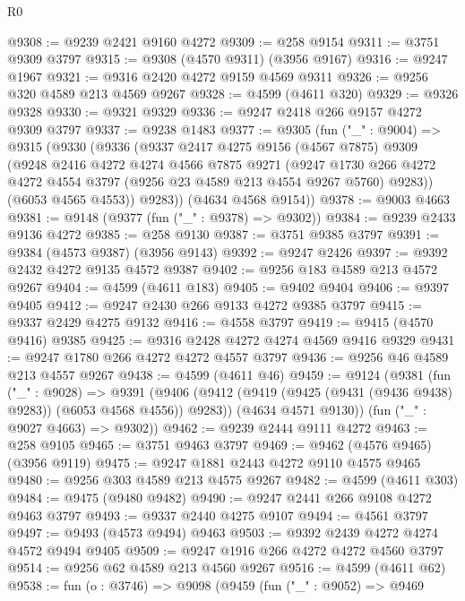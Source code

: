 \begin{lexlean}{R0}
\begin{coremodule}
@9308 := @9239 @2421 @9160 @4272
@9309 := @258 @9154
@9311 := @3751 @9309 @3797
@9315 := @9308 (@4570 @9311) (@3956 @9167)
@9316 := @9247 @1967
@9321 := @9316 @2420 @4272 @9159 @4569 @9311
@9326 := @9256 @320 @4589 @213 @4569 @9267
@9328 := @4599 (@4611 @320)
@9329 := @9326 @9328
@9330 := @9321 @9329
@9336 := @9247 @2418 @266 @9157 @4272 @9309 @3797
@9337 := @9238 @1483
@9377 := @9305
    (fun ("_" : @9004) =>
    @9315
      (@9330
        (@9336
          (@9337
            @2417
            @4275
            @9156
            (@4567 @7875)
            @9309
            (@9248
              @2416
              @4272
              @4274
              @4566
              @7875
              @9271
              (@9247
                @1730
                @266
                @4272
                @4272
                @4554
                @3797
                (@9256 @23 @4589 @213 @4554 @9267 @5760)
                @9283))
            (@6053 @4565 @4553))
          @9283))
      (@4634 @4568 @9154))
@9378 := @9003 @4663
@9381 := @9148 (@9377 (fun ("_" : @9378) => @9302))
@9384 := @9239 @2433 @9136 @4272
@9385 := @258 @9130
@9387 := @3751 @9385 @3797
@9391 := @9384 (@4573 @9387) (@3956 @9143)
@9392 := @9247 @2426
@9397 := @9392 @2432 @4272 @9135 @4572 @9387
@9402 := @9256 @183 @4589 @213 @4572 @9267
@9404 := @4599 (@4611 @183)
@9405 := @9402 @9404
@9406 := @9397 @9405
@9412 := @9247 @2430 @266 @9133 @4272 @9385 @3797
@9415 := @9337 @2429 @4275 @9132
@9416 := @4558 @3797
@9419 := @9415 (@4570 @9416) @9385
@9425 := @9316 @2428 @4272 @4274 @4569 @9416 @9329
@9431 := @9247 @1780 @266 @4272 @4272 @4557 @3797
@9436 := @9256 @46 @4589 @213 @4557 @9267
@9438 := @4599 (@4611 @46)
@9459 := @9124
    (@9381
      (fun ("_" : @9028) =>
      @9391
        (@9406 (@9412 (@9419 (@9425 (@9431 (@9436 @9438) @9283)) (@6053 @4568 @4556)) @9283))
        (@4634 @4571 @9130))
      (fun ("_" : @9027 @4663) => @9302))
@9462 := @9239 @2444 @9111 @4272
@9463 := @258 @9105
@9465 := @3751 @9463 @3797
@9469 := @9462 (@4576 @9465) (@3956 @9119)
@9475 := @9247 @1881 @2443 @4272 @9110 @4575 @9465
@9480 := @9256 @303 @4589 @213 @4575 @9267
@9482 := @4599 (@4611 @303)
@9484 := @9475 (@9480 @9482)
@9490 := @9247 @2441 @266 @9108 @4272 @9463 @3797
@9493 := @9337 @2440 @4275 @9107
@9494 := @4561 @3797
@9497 := @9493 (@4573 @9494) @9463
@9503 := @9392 @2439 @4272 @4274 @4572 @9494 @9405
@9509 := @9247 @1916 @266 @4272 @4272 @4560 @3797
@9514 := @9256 @62 @4589 @213 @4560 @9267
@9516 := @4599 (@4611 @62)
@9538 := fun (o : @3746) =>
  @9098
    (@9459
      (fun ("_" : @9052) =>
      @9469

\end{coremodule}
\end{lexlean}
